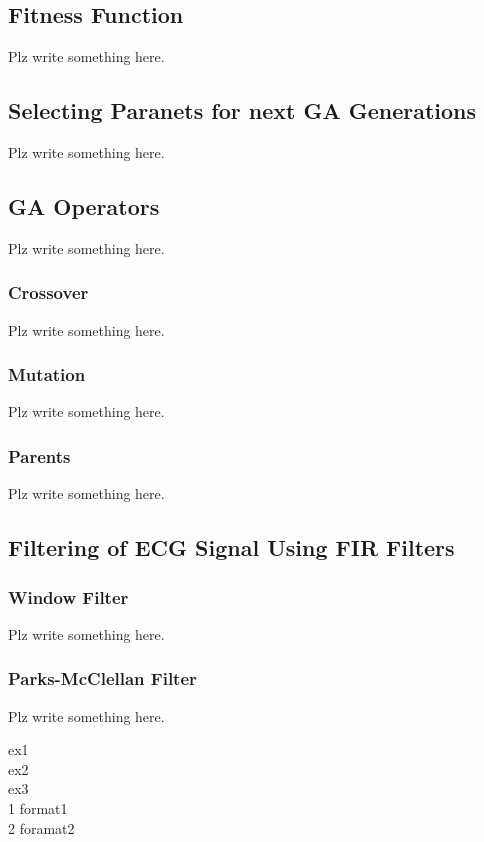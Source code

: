 \documentclass[a4paper, 11pt]{article}
\begin{document}
    \subsection{Fitness Function}\label{sec:meth_sub2}
        Plz write something here.
    \subsection{Selecting Paranets for next GA Generations}\label{sec:meth_sub3}
        Plz write something here.
    \subsection{GA Operators}\label{sec:meth_sub4}
        Plz write something here.
        \subsubsection{Crossover}
            Plz write something here.
        \subsubsection{Mutation}
            Plz write something here.
        \subsubsection{Parents}
            Plz write something here.
    \subsection{Filtering of ECG Signal Using FIR Filters}\label{sec:meth_sub5}
        \subsubsection{Window Filter}
            Plz write something here.
        \subsubsection{Parks-McClellan Filter}
            Plz write something here.
    
    \begin{flushleft}
        ex1\\
        ex2\\
        ex3\\
        1 format1\\
        2 foramat2\\
    \end{flushleft}
\end{document}
